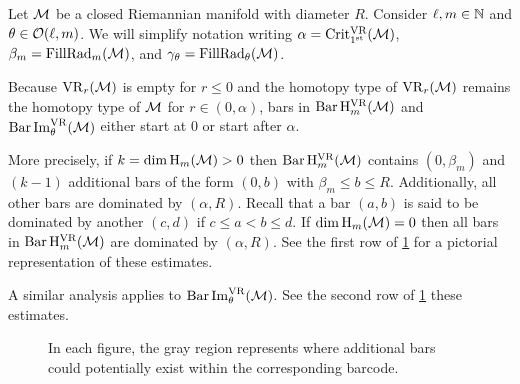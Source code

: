 Let \(\mathcal{M}\) be a closed Riemannian manifold with diameter \(R\).
Consider \(\ell, m \in \mathbb{N}\) and \(\theta \in \mathcal{O}(\ell,m)\).
We will simplify notation writing \(\alpha = \operatorname{Crit^{\mathrm{VR}}_{1^{\mathrm{st}}}}(\mathcal{M})\), \(\beta_m = \operatorname{FillRad}_{m}(\mathcal{M})\), and \(\gamma_\theta = \operatorname{FillRad}_{\theta}(\mathcal{M})\).

Because $\mathrm{VR}_r(\mathcal{M})$ is empty for \(r \leq 0\) and the homotopy type of $\mathrm{VR}_r(\mathcal{M})$ remains the homotopy type of $\mathcal{M}$ for $r \in (0, \alpha)$, bars in \(\operatorname{Bar} \mathrm{H}_m^{\mathrm{VR}}(\mathcal{M})\) and $\operatorname{Bar}\operatorname{Im}_\theta^{\mathrm{VR}}(\mathcal{M})$ either start at $0$ or start after $\alpha$.

More precisely,
if \(k = \dim \operatorname{H}_m(\mathcal{M}) > 0\) then $\operatorname{Bar}\mathrm{H}_m^{\mathrm{VR}}(\mathcal{M})$ contains $(0, \beta_m)$ and \((k - 1)\) additional bars of the form \((0, b)\) with \(\beta_m \leq b \leq R\).
Additionally, all other bars are dominated by \((\alpha, R)\).
Recall that a bar $(a, b)$ is said to be dominated by another $(c,d)$ if $c \leq a < b \leq d$.
If \(\dim \operatorname{H}_m(\mathcal{M}) = 0\) then all bars in \(\operatorname{Bar}\mathrm{H}_m^{\mathrm{VR}}(\mathcal{M})\) are dominated by \((\alpha, R)\).
See the first row of \cref{fig:barcodes_general} for a pictorial representation of these estimates.

A similar analysis applies to $\operatorname{Bar}\operatorname{Im}_\theta^{\mathrm{VR}}(\mathcal{M})$.
See the second row of \cref{fig:barcodes_general} these estimates.

\begin{figure}
	\centering
	
	\caption{In each figure, the gray region represents where additional bars could potentially exist within the corresponding barcode.}
	\label{fig:barcodes_general}
\end{figure}